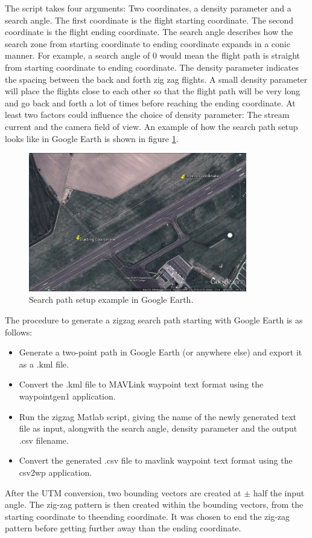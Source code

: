 The script takes four arguments: Two coordinates, a density parameter and a search angle.
The first coordinate is the flight starting coordinate. The second coordinate is the flight ending
coordinate.
The search angle describes how the search zone from starting coordinate to ending coordinate
expands in a conic manner.
For example, a search angle of 0 would mean the flight path is straight from starting coordinate to
ending coordinate.
The density parameter indicates the spacing between the back and forth zig zag flights.
A small density parameter will place the flights close to each other so that
the flight path will be very long and go back and forth a lot of times before reaching the ending
coordinate.
At least two factors could influence the choice of density parameter: The stream current and the camera field of view.
An example of how the search path setup looks like in Google Earth is shown in figure
\ref{fig:googlepath}.
\begin{figure}[ht]
	\centering
	\includegraphics[width=0.85\textwidth]{Images/googlepath}
	\caption[Search path setup.]{Search path setup example in Google Earth.}
	\label{fig:googlepath}
\end{figure}
The procedure to generate a zigzag search path starting with Google Earth is as follows:
\begin{itemize}
\item Generate a two-point path in Google Earth (or anywhere else) and export it as a .kml file.
\item Convert the .kml file to MAVLink waypoint text format using the waypointgen1 application.
\item Run the zigzag Matlab script, giving the name of the newly generated text file as input,
alongwith the search angle, density parameter and the output .csv filename.
\item Convert the generated .csv file to mavlink waypoint text format using the csv2wp application.
\end{itemize}
After the UTM conversion, two bounding vectors are created at \(\pm\) half the input angle.
The zig-zag pattern is then created within the bounding vectors, from the starting coordinate to theending coordinate. It was chosen to end the zig-zag pattern before getting further away than the
ending coordinate.

